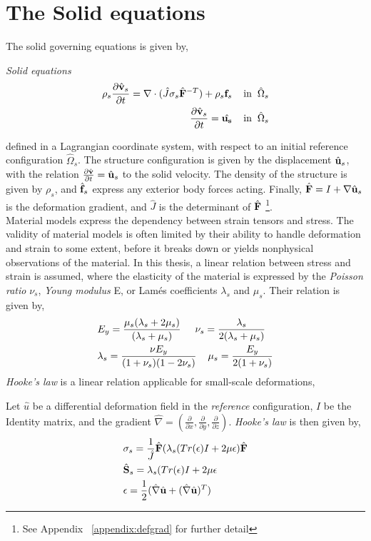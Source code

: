 \section{The Solid equations}
\label{sec:solprob}
The solid governing equations is given by, 
\begin{equat}
\textit{Solid equations}
\begin{align}
\rho_s \frac{\partial \hat{\mathbf{v}}_s}{\partial t} = \nabla \cdot ( \hat{J} \sigma_s \hat{\mathbf{F}}^{-T})  + \rho_s \mathbf{f}_s
\hspace{4mm} \text{in} \hspace{2mm} \hat{\Omega}_s \\
\frac{\partial \hat{\mathbf{v}}_s}{\partial t} = \hat{\mathbf{u_s}} \hspace{4mm} \text{in} \hspace{2mm}  \hat{\Omega}_s
\end{align}
\end{equat}
defined in a Lagrangian coordinate system, with respect to an initial reference configuration $\hat{\Omega}_s$. The structure configuration is given by the displacement $\hat{\mathbf{u}}_s$, with the relation $\frac{\partial \hat{\mathbf{v}}}{\partial t} = \hat{\mathbf{u}}_s$ to the solid velocity. The density of the structure is given by $\rho_s$, and $\hat{\mathbf{f}}_s$ express any exterior body forces acting. Finally, $\hat{\mathbf{F}} = I + \nabla \hat{\mathbf{u}}_s$ is the deformation gradient, and $\hat{J}$ is the determinant of $\hat{\mathbf{F}}$ \footnote{See Appendix ~\ref{appendix:defgrad} for further detail}. \\
Material models express the dependency between strain tensors and stress. The validity of material models is often limited by their ability to handle deformation and strain to some extent, before it breaks down or yields nonphysical observations of the material. In this thesis, a linear relation between stress and strain is assumed, where the elasticity of the material is expressed by the \textit{Poisson ratio} $\nu_s$, \textit{Young modulus} E, or Lamés coefficients $\lambda_s$ and $\mu_s$. Their relation is given by,
\begin{align*}
&E_y = \frac{ \mu_s ( \lambda_s + 2 \mu_s) }{ ( \lambda_s + \mu_s ) } 
\hspace{5mm} \nu_s = \frac{\lambda_s}{2(\lambda_s + \mu_s)} \\
&\lambda_s = \frac{\nu E_y}{(1 + \nu_s)(1 - 2\nu_s)} \hspace{4mm} \mu_s = \frac{E_y}{2(1 + \nu_s)} 
\end{align*}
\textit{Hooke's law} is a linear relation applicable for small-scale deformations,
\begin{defn}
Let $\hat{u}$ be a differential deformation field in the \textit{reference} configuration, $I$ be the Identity matrix, and the gradient $\hat{\nabla} = (\frac{\partial}{\partial x}, \frac{\partial}{\partial y}, \frac{\partial}{\partial z}) $. \textit{Hooke's law} is then given by,
\begin{align*}
&\sigma_s = \frac{1}{\hat{J}} \hat{\mathbf{F}}(\lambda_s(Tr(\epsilon) I + 2 \mu  \epsilon)\hat{\mathbf{F}} \\
&\hat{\mathbf{S}}_s = \lambda_s(Tr(\epsilon) I + 2 \mu \epsilon \\
&\epsilon = \frac{1}{2}(\hat{\nabla} \hat{\mathbf{u}} + (\hat{\nabla} \hat{\mathbf{u}})^T ) 
\end{align*} 
\end{defn}

